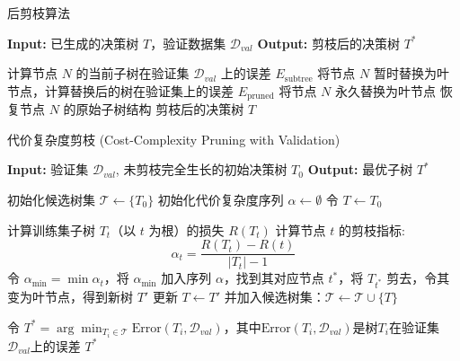 \begin{algorithm}
	\caption{后剪枝算法}
	\begin{algorithmic}[1]
		\State \textbf{Input:} 已生成的决策树 \( T \)，验证数据集 \( \mathcal{D}_{val} \)
		\State \textbf{Output:} 剪枝后的决策树 \( T^* \)
		
		\State 计算节点 \( N \) 的当前子树在验证集 \( \mathcal{D}_{val} \) 上的误差 \( E_{\text{subtree}} \)
		\State 将节点 \( N \) 暂时替换为叶节点，计算替换后的树在验证集上的误差 \( E_{\text{pruned}} \)
		\State 将节点 \( N \) 永久替换为叶节点
		\Else
		\State 恢复节点 \( N \) 的原始子树结构
		\EndIf
		\EndFor
		\State \Return 剪枝后的决策树 \( T \)
		\EndFunction
	\end{algorithmic}
\end{algorithm}
	
\begin{algorithm}
	\caption{代价复杂度剪枝 (Cost-Complexity Pruning with Validation)}
	\begin{algorithmic}[1]
		\State \textbf{Input:} 验证集 $\mathcal{D}_{val}$, 未剪枝完全生长的初始决策树 $T_0$
		\State \textbf{Output:} 最优子树 $T^*$
		
		\State 初始化候选树集 $\mathcal{T} \gets \{ T_0 \}$
		\State 初始化代价复杂度序列 $\alpha \gets \emptyset$
		\State 令 $T \gets T_0$
		
		\State 计算训练集子树 $T_t$（以 $t$ 为根）的损失 $R(T_t)$
		\State 计算节点 $t$ 的剪枝指标:
		\[
		\alpha_t = \frac{R(T_t) - R(t)}{|T_t| - 1}
		\]
		\EndFor
		\State 令 $\alpha_{\min} = \min \alpha_t$，将 $\alpha_{\min}$ 加入序列 $\alpha$，找到其对应节点 $t^*$，将 $T_{t^*}$ 剪去，令其变为叶节点，得到新树 $T'$
		\State 更新 $T \gets T'$ 并加入候选树集：$\mathcal{T} \gets \mathcal{T} \cup \{T\}$
		\EndWhile

		\State 令 $T^* = \arg\min_{T_i \in \mathcal{T}}\text{Error}(T_i, \mathcal{D}_{val})$，其中$\text{Error}(T_i, \mathcal{D}_{val})$是树$T_i$在验证集$\mathcal{D}_{val}$上的误差
		\State \Return $T^*$
		\EndFunction
	\end{algorithmic}
\end{algorithm}

